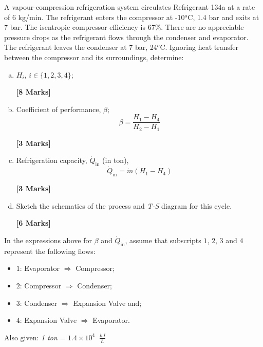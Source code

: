 \documentclass[calculator,steamtables,refrigeranttables,psychrometricchart,datasheet,sample]{exam}
\newcommand{\frc}{\displaystyle\frac}
\begin{document}
\begin{question} A vapour-compression refrigeration system circulates Refrigerant 134a at a rate of 6 kg/min. The refrigerant enters the compressor at -10$^{\text{o}}$C, 1.4 bar and exits at 7 bar. The isentropic compressor efficiency is 67$\%$. There are no appreciable pressure drops as the refrigerant flows through the condenser and evaporator. The refrigerant leaves the condenser at 7 bar, 24$^{o}$C. Ignoring heat transfer between the compressor and its surroundings, determine:
\begin{enumerate}[(a)]
\item $H_{i}$, $i\in\{1,2,3,4\}$;
\begin{flushright}
{\bf [8 Marks]}
\end{flushright} 
\item Coefficient of performance, $\beta$;
\begin{displaymath}
\beta = \frc{H_{1}-H_{4}}{H_{2}-H_{1}}
\end{displaymath}
\begin{flushright}
{\bf [3 Marks]}
\end{flushright} 
\item Refrigeration capacity, $\dot{Q}_{\text{in}}$ (in ton),
\begin{displaymath}
\dot{Q}_{\text{in}}=\dot{m}\left(H_{1}-H_{4}\right)
\end{displaymath}
\begin{flushright}
{\bf [3 Marks]}
\end{flushright} 
\item Sketch the schematics of the process and {\it T-S} diagram for this cycle.
\begin{flushright}
{\bf [6 Marks]}
\end{flushright} 
\end{enumerate}
In the expressions above for $\beta$ and $\dot{Q}_{\text{in}}$, assume that subscripts $1$, $2$, $3$ and $4$ represent the following flows:
\begin{itemize}
\item $1$: Evaporator $\Rightarrow$ Compressor; 
\item $2$: Compressor $\Rightarrow$ Condenser; 
\item $3$: Condenser $\Rightarrow$  Expansion Valve and; 
\item $4$: Expansion Valve $\Rightarrow$   Evaporator.
\end{itemize}
Also given: {\it 1 ton} = $1.4\times 10^{4}\;\;\frc{kJ}{h}$
\end{question}
\end{document}
